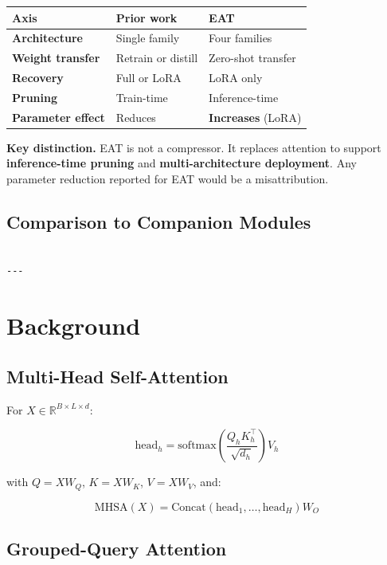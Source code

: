 \begin{table}[H]
\centering
\small
\begin{tabular}{lll}
\toprule
\textbf{Axis} & \textbf{Prior work} & \textbf{EAT} \\
\midrule
\textbf{Architecture} & Single family & Four families \\
\textbf{Weight transfer} & Retrain or distill & Zero-shot transfer \\
\textbf{Recovery} & Full or LoRA & LoRA only \\
\textbf{Pruning} & Train-time & Inference-time \\
\textbf{Parameter effect} & Reduces & \textbf{Increases} (LoRA) \\
\bottomrule
\end{tabular}
\end{table}

\textbf{Key distinction.} EAT is not a compressor. It replaces attention to 
support \textbf{inference-time pruning} and \textbf{multi-architecture deployment}. 
Any parameter reduction reported for EAT would be a misattribution.

\subsection{Comparison to Companion Modules}

\begin{lstlisting}

---
\end{lstlisting}


\section{Background}

\subsection{Multi-Head Self-Attention}

For $X \in \mathbb{R}^{B \times L \times d}$:

\[
\text{head}_h = \text{softmax}\!\left(\frac{Q_h K_h^\top}{\sqrt{d_h}}\right) V_h
\tag{3.1}
\]

with $Q = X W_Q$, $K = X W_K$, $V = X W_V$, and:

\[
\text{MHSA}(X) = \text{Concat}(\text{head}_1, \dots, \text{head}_H) W_O
\tag{3.2}
\]

\subsection{Grouped-Query Attention}

